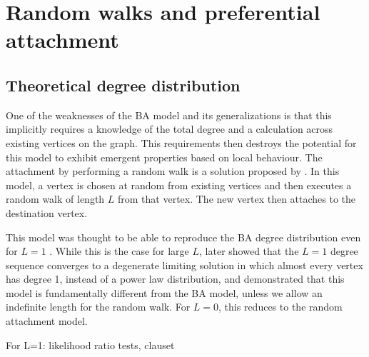 \section{Random walks and preferential attachment}\label{section:random-walk}

\subsection{Theoretical degree distribution}
One of the weaknesses of the BA model and its generalizations is that this implicitly requires a knowledge of the total degree and a calculation across existing vertices on the graph. This requirements then destroys the potential for this model to exhibit emergent properties based on local behaviour. The attachment by performing a random walk is a solution proposed by \citet{Saramaki2004}. In this model, a vertex is chosen at random from existing vertices and then executes a random walk of length $L$ from that vertex. The new vertex then attaches to the destination vertex. 

This model was thought to be able to reproduce the BA degree distribution even for $L=1$ \citep{Saramaki2004,J.P.Saramaki2004}. While this is the case for large $L$, \citet{Cannings2013} later showed that the $L=1$ degree sequence converges to a degenerate limiting solution in which almost every vertex has degree 1, instead of a power law distribution, and demonstrated that this model is fundamentally different from the BA model, unless we allow an indefinite length for the random walk. For $L = 0$, this reduces to the random attachment model. 

For L=1: likelihood ratio tests, clauset